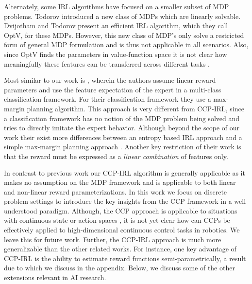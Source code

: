 \documentclass{article}
\begin{document}
Alternately, some IRL algorithms have focused on a smaller subset of MDP problems. Todorov  introduced a new class of MDPs which are linearly solvable. Dvijotham and Todorov  present an efficient IRL algorithm, which they call OptV, for these MDPs. However, this new class of MDP's only solve a restricted form of general MDP formulation and is thus not applicable in all scenarios. 
Also, since OptV finds the parameters in value-function space it is not clear how meaningfully these features can be transferred across different tasks \cite{levine2012continuous}.

Most similar to our work is \cite{klein2012inverse}, wherein the authors assume linear reward parameters and use the feature expectation of the expert in a multi-class classification framework. For their classification framework they use a max-margin planning algorithm. This approach is very different from CCP-IRL, since a classification framework has no notion of the MDP problem being solved and tries to directly imitate the expert behavior. Although beyond the scope of our work their exist more differences between an entropy based IRL approach and a simple max-margin planning approach \cite{Ratliff2006, ziebart2010modeling}. Another key restriction of their work is that the reward must be expressed as a \textit{linear combination} of features only.


In contrast to previous work our CCP-IRL algorithm is generally applicable as it makes no assumption on the MDP framework and is applicable to both linear and non-linear reward parameterizations.
In this work we focus on discrete problem settings to introduce the key insights from the CCP framework in a well understood paradigm. Although, the CCP approach is applicable to situations with continuous state or action spaces \cite{}, it is not yet clear how can CCPs be effectively applied to high-dimensional continuous control tasks in robotics. We leave this for future work.
Further, the CCP-IRL approach is much more generalizable than the other related works. For instance, one key advantage of CCP-IRL is the ability to estimate reward functions semi-parametrically, a result due to \cite{magnac} which we discuss in the appendix. Below, we discuss some of the other extensions relevant in AI research.
\end{document}
